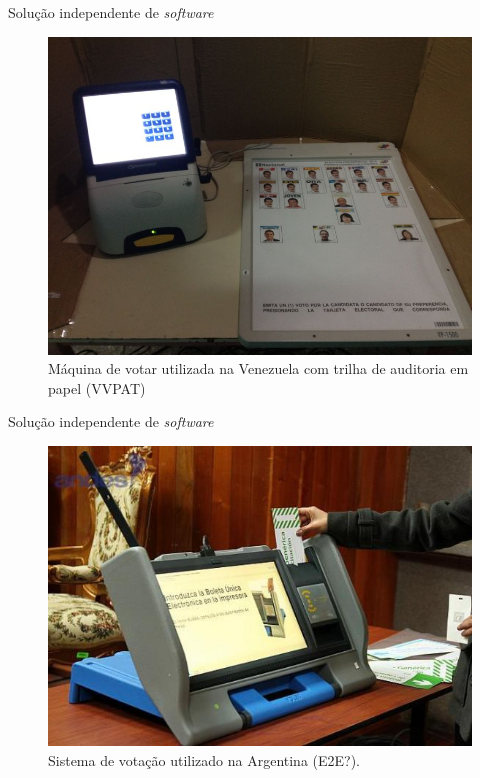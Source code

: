 \documentclass[10pt]{beamer}
\begin{document}
\begin{frame}{Solução independente de \emph{software}}
\begin{figure}
\caption{Máquina de votar utilizada na Venezuela com trilha de auditoria em papel (VVPAT)}
\begin{center}
\includegraphics[scale=0.35]{venezuela.jpg} 
\end{center}
\end{figure}
\end{frame}

\begin{frame}{Solução independente de \emph{software}}
\begin{figure}
\caption{Sistema de votação utilizado na Argentina (E2E?).}
\begin{center}
\includegraphics[scale=0.4]{argentina.jpg} 
\end{center}
\end{figure}
\end{frame}
\end{document}
